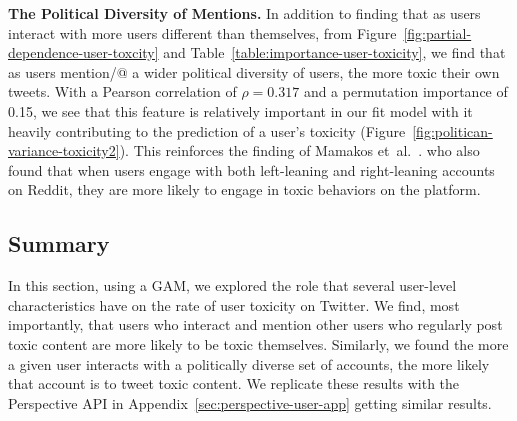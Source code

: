 \vspace{2pt}\noindent
\noindent
\textbf{The Political Diversity of Mentions.}
In addition to finding that as users interact with more users different than themselves, from Figure~\ref{fig:partial-dependence-user-toxcity} and Table~\ref{table:importance-user-toxicity}, we find that as users mention/@ a wider political diversity of users, the more toxic their own tweets. With a Pearson correlation of $\rho =0.317$ and a permutation importance of  0.15, we see that this feature is relatively important in our fit model with it heavily contributing to the prediction of a user's toxicity (Figure~\ref{fig:politican-variance-toxicity2}).  This reinforces the finding of Mamakos et~al.~\cite{mamakos2023social}. who also found that when users engage with both left-leaning and right-leaning accounts on Reddit, they are more likely to engage in toxic behaviors on the platform. 









\subsection{Summary}
In this section, using a GAM, we explored the role that several user-level characteristics have on the rate of user toxicity on Twitter. We find, most importantly, that users who interact and mention other users who regularly post toxic content are more likely to be toxic themselves. Similarly, we found the more a given user interacts with a politically diverse set of accounts, the more likely that account is to tweet toxic content. We replicate these results with the Perspective API in Appendix~\ref{sec:perspective-user-app} getting similar results. 
